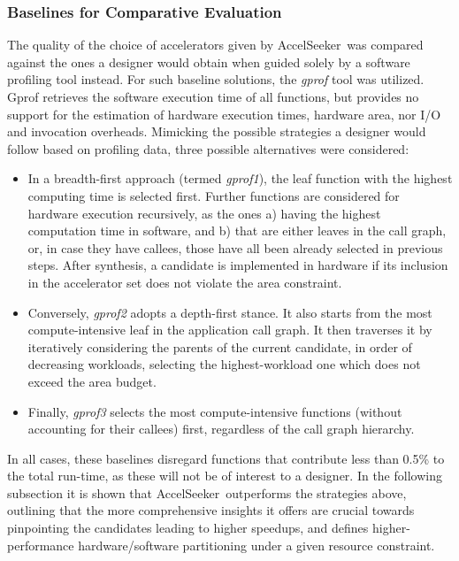 \documentclass[]{usiinfthesis}
\newcommand{\aseeker}{{AccelSeeker}}
\begin{document}
%
%
%
\subsubsection{Baselines for Comparative Evaluation} 
The quality of the choice of accelerators given by \aseeker\ was compared against 
the ones a designer would obtain when guided solely by a software profiling tool
instead. For such baseline solutions, the \emph{gprof} tool \cite{GrahamJun82} 
was utilized. Gprof retrieves the software execution time of all
functions, but provides no support for the estimation of hardware
execution times, hardware area, nor I/O and invocation
overheads. Mimicking the possible strategies a designer would follow
based on profiling data, three possible alternatives were considered:

\begin{itemize}
\item{} In a breadth-first approach (termed \emph{gprof1}), the leaf
  function with the highest computing time is selected first. Further
  functions are considered for hardware execution recursively, as the
  ones a) having the highest computation time in software, and b) that
  are either leaves in the call graph, or, in case they have callees,
  those have all been already selected in previous steps. After
  synthesis, a candidate is implemented in hardware if its inclusion
  in the accelerator set does not violate the area constraint.
\item{} Conversely, \emph{gprof2} adopts a depth-first stance. It also starts from
the most compute-intensive leaf in the application call graph. It then traverses it
by iteratively considering the parents of the current candidate, in order
of decreasing workloads, selecting the highest-workload one which does 
not exceed the area budget. 
\item{} Finally, \emph{gprof3} selects the most compute-intensive functions (without
accounting for their callees) first, regardless of the call graph hierarchy. 
\end{itemize}

In all cases, these baselines disregard functions that contribute less
than 0.5\% to the total run-time, as these will not be of interest to
a designer. In the following subsection it is shown that \aseeker\ 
outperforms the strategies above, outlining that the more
comprehensive insights it offers are crucial towards pinpointing the
candidates leading to higher speedups, and defines
higher-performance hardware/software partitioning under a given resource
constraint.
\end{document}

